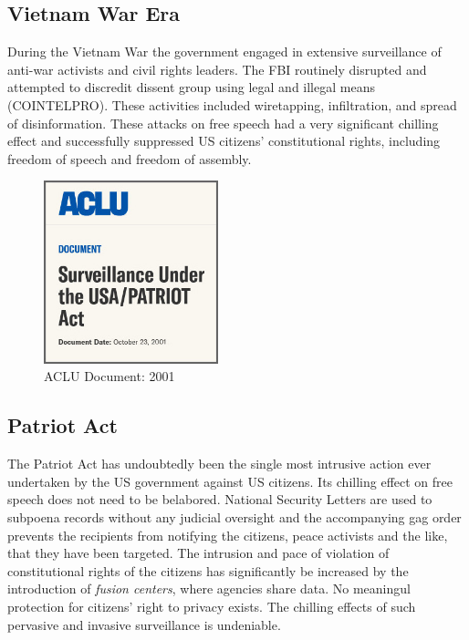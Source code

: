 \documentclass[twoside,twocolumn]{article}
\begin{document}
\subsection*{Vietnam War Era}
During the Vietnam War the government engaged in extensive surveillance
of anti-war activists and civil rights leaders.
The FBI routinely disrupted and attempted to discredit dissent group using legal and illegal means (COINTELPRO)\cite{cointelpro}.
These activities included wiretapping, infiltration, and spread of disinformation.
These attacks on free speech had a very significant chilling effect and successfully suppressed US citizens' constitutional rights,
including freedom of speech and freedom of assembly\cite{cointelpro}.


\begin{figure}
\centering
  \includegraphics[width=0.45\textwidth]{i/pa.jpg}
  \caption{ACLU Document: 2001\cite{ACLU}
  }
\end{figure}


\subsection*{Patriot Act}
The Patriot Act has undoubtedly been the single most intrusive action ever undertaken
by the US government against US citizens.
Its chilling effect on free speech does not need to be belabored.
National Security Letters are used to subpoena records without any judicial oversight and the accompanying
gag order prevents the recipients from notifying the citizens, peace activists and the like, that they have been targeted.
The intrusion and pace of violation of constitutional rights of the citizens has significantly be increased by the introduction of \textit{fusion centers}\cite{fusion},
where agencies share data.
No meaningul protection for citizens' right to privacy exists.
The chilling effects of such pervasive and invasive surveillance is undeniable\cite{ACLU}.
\end{document}
